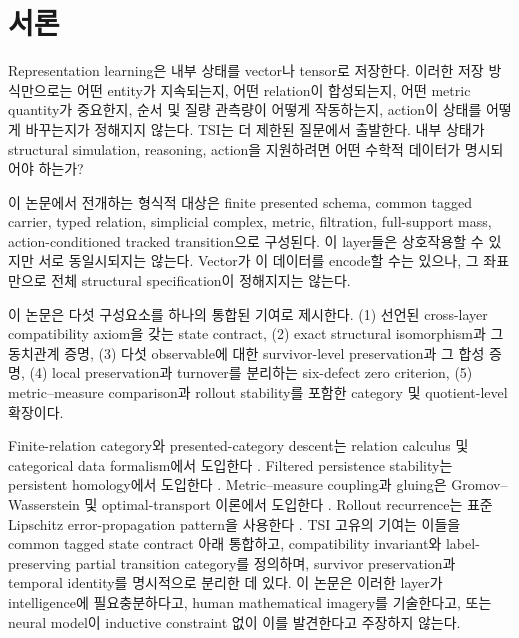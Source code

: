 \section{서론}

Representation learning은 내부 상태를 vector나 tensor로 저장한다. 이러한 저장
방식만으로는 어떤 entity가 지속되는지, 어떤 relation이 합성되는지, 어떤 metric
quantity가 중요한지, 순서 및 질량 관측량이 어떻게 작동하는지, action이 상태를
어떻게 바꾸는지가 정해지지 않는다. TSI는 더 제한된 질문에서 출발한다. 내부
상태가 structural simulation, reasoning, action을 지원하려면 어떤 수학적 데이터가
명시되어야 하는가?

이 논문에서 전개하는 형식적 대상은 finite presented schema, common tagged
carrier, typed relation, simplicial complex, metric, filtration, full-support
mass, action-conditioned tracked transition으로 구성된다. 이 layer들은 상호작용할
수 있지만 서로 동일시되지는 않는다. Vector가 이 데이터를 encode할 수는 있으나,
그 좌표만으로 전체 structural specification이 정해지지는 않는다.

이 논문은 다섯 구성요소를 하나의 통합된 기여로 제시한다. (1) 선언된 cross-layer
compatibility axiom을 갖는 state contract, (2) exact structural isomorphism과
그 동치관계 증명, (3) 다섯 observable에 대한 survivor-level preservation과 그
합성 증명, (4) local preservation과 turnover를 분리하는 six-defect zero
criterion, (5) metric--measure comparison과 rollout stability를 포함한 category
및 quotient-level 확장이다.

Finite-relation category와 presented-category descent는 relation calculus 및
categorical data formalism에서 도입한다
\cite{freydscedrov1990categories,spivak2012functorial,
spivakwisnesky2015relational}. Filtered persistence stability는 persistent
homology에서 도입한다 \cite{cohensteiner2007stability,chazal2009proximity}.
Metric--measure coupling과 gluing은 Gromov--Wasserstein 및 optimal-transport
이론에서 도입한다 \cite{memoli2011gromov,peyre2019computational}. Rollout
recurrence는 표준 Lipschitz error-propagation pattern을 사용한다
\cite{asadi2018lipschitz}. TSI 고유의 기여는 이들을 common tagged state
contract 아래 통합하고, compatibility invariant와 label-preserving partial
transition category를 정의하며, survivor preservation과 temporal identity를
명시적으로 분리한 데 있다. 이 논문은 이러한 layer가 intelligence에 필요충분하다고,
human mathematical imagery를 기술한다고, 또는 neural model이 inductive
constraint 없이 이를 발견한다고 주장하지 않는다.
